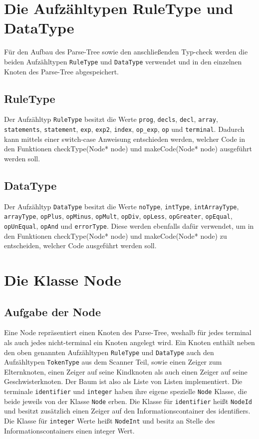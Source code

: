 \documentclass[
a4paper,   %
11pt,      %
oneside,   %
onecolumn, %
final      %
]{article}
\newcommand{\code}[1]{\lstinline$#1$}
\begin{document}
\section{Die Aufzähltypen RuleType und DataType}
Für den Aufbau des Parse-Tree sowie den anschließenden Typ-check werden die beiden Aufzähltypen \code{RuleType} und \code{DataType} verwendet und in den einzelnen Knoten des Parse-Tree abgespeichert.
\subsection{RuleType}
Der Aufzähltyp \code{RuleType} besitzt die Werte \code{prog}, \code{decls}, \code{decl}, \code{array}, \code{statements}, \code{statement}, \code{exp}, \code{exp2}, \code{index}, \code{op_exp}, \code{op} und \code{terminal}. Dadurch kann mittels einer switch-case Anweisung entschieden werden, welcher Code in den Funktionen checkType(Node* node) und makeCode(Node* node) ausgeführt werden soll.
\subsection{DataType}
Der Aufzähltyp \code{DataType} besitzt die Werte \code{noType}, \code{intType}, \code{intArrayType}, \code{arrayType}, \code{opPlus}, \code{opMinus}, \code{opMult}, \code{opDiv}, \code{opLess}, \code{opGreater}, \code{opEqual}, \code{opUnEqual}, \code{opAnd} und \code{errorType}. Diese werden ebenfalls dafür verwendet, um in den Funktionen checkType(Node* node) und makeCode(Node* node) zu entscheiden, welcher Code ausgeführt werden soll.

\section{Die Klasse Node} \label{sec:node}
\subsection{Aufgabe der Node}
Eine Node repräsentiert einen Knoten des Parse-Tree, weshalb für jedes terminal als auch jedes nicht-terminal ein Knoten angelegt wird. Ein Knoten enthält neben den oben genannten Aufzähltypen \code{RuleType} und \code{DataType} auch den Aufzähltypen \code{TokenType} aus dem Scanner Teil, sowie einen Zeiger zum Elternknoten, einen Zeiger auf seine Kindknoten als auch einen Zeiger auf seine Geschwisterknoten. Der Baum ist also als Liste von Listen implementiert.
\newline
Die terminale \code{identifier} und \code{integer} haben ihre eigene spezielle \code{Node} Klasse, die beide jeweils von der Klasse \code{Node} erben. Die Klasse für \code{identifier} heißt \code{NodeId} und besitzt zusätzlich einen Zeiger auf den Informationscontainer des identifiers. Die Klasse für \code{integer} Werte heißt \code{NodeInt} und besitz an Stelle des Informationscontainers einen integer Wert.
\end{document}
